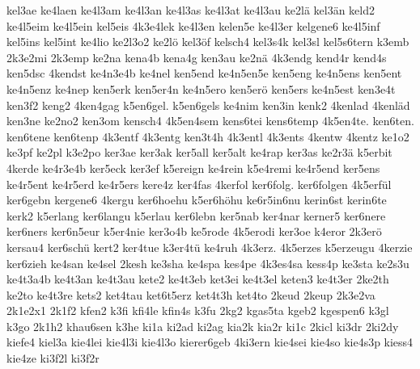 {    kel3ae
    ke4laen
    ke4l3am
    ke4l3an
    ke4l3as
    ke4l3at
    ke4l3au
    ke2lä
    kel3än
    keld2
    ke4l5eim
    ke4l5ein
    kel5eis
    4k3e4lek
    ke4l3en
    kelen5e
    ke4l3er
    kelgene6
    ke4l5inf
    kel5ins
    kel5int
    ke4lio
    ke2l3o2
    ke2lö
    kel3öf
    kelsch4
    kel3s4k
    kel3sl
    kel5s6tern
    k3emb
    2k3e2mi
    2k3emp
    ke2na
    kena4b
    kena4g
    ken3au
    ke2nä
    4k3endg
    kend4r
    kend4s
    ken5dsc
    4kendst
    ke4n3e4b
    ke4nel
    ken5end
    ke4n5en5e
    ken5eng
    ke4n5ens
    ken5ent
    ke4n5enz
    ke4nep
    ken5erk
    ken5er4n
    ke4n5ero
    ken5erö
    ken5ers
    ke4n5est
    ken3e4t
    ken3f2
    keng2
    4ken4gag
    k5en6gel.
    k5en6gels
    ke4nim
    ken3in
    kenk2
    4kenlad
    4kenläd
    ken3ne
    ke2no2
    ken3om
    kensch4
    4k5en4sem
    kens6tei
    kens6temp
    4k5en4te.
    ken6ten.
    ken6tene
    ken6tenp
    4k3entf
    4k3entg
    ken3t4h
    4k3entl
    4k3ents
    4kentw
    4kentz
    ke1o2
    ke3pf
    ke2pl
    k3e2po
    ker3ae
    ker3ak
    ker5all
    ker5alt
    ke4rap
    ker3as
    ke2r3ä
    k5erbit
    4kerde
    ke4r3e4b
    ker5eck
    ker3ef
    k5ereign
    ke4rein
    k5e4remi
    ke4r5end
    ker5ens
    ke4r5ent
    ke4r5erd
    ke4r5ers
    kere4z
    ker4fas
    4kerfol
    ker6folg.
    ker6folgen
    4k5erfül
    ker6gebn
    kergene6
    4kergu
    ker6hoehu
    k5er6höhu
    ke6r5in6nu
    kerin6st
    kerin6te
    kerk2
    k5erlang
    ker6langu
    k5erlau
    ker6lebn
    ker5nab
    ker4nar
    kerner5
    ker6nere
    ker6ners
    ker6n5eur
    k5er4nie
    ker3o4b
    ke5rode
    4k5erodi
    ker3oe
    k4eror
    2k3erö
    kersau4
    ker6schü
    kert2
    ker4tue
    k3er4tü
    ke4ruh
    4k3erz.
    4k5erzes
    k5erzeugu
    4kerzie
    ker6zieh
    ke4san
    ke4sel
    2kesh
    ke3sha
    ke4spa
    kes4pe
    4k3es4sa
    kess4p
    ke3sta
    ke2s3u
    ke4t3a4b
    ke4t3an
    ke4t3au
    kete2
    ke4t3eb
    ket3ei
    ke4t3el
    keten3
    ke4t3er
    2ke2th
    ke2to
    ke4t3re
    kets2
    ket4tau
    ket6t5erz
    ket4t3h
    ket4to
    2keud
    2keup
    2k3e2va
    2k1e2x1
    2k1f2
    kfen2
    k3fi
    kfi4le
    kfin4s
    k3fu
    2kg2
    kgas5ta
    kgeb2
    kgespen6
    k3gl
    k3go
    2k1h2
    khau6sen
    k3he
    ki1a
    ki2ad
    ki2ag
    kia2k
    kia2r
    ki1c
    2kicl
    ki3dr
    2ki2dy
    kiefe4
    kiel3a
    kie4lei
    kie4l3i
    kie4l3o
    kierer6geb
    4ki3ern
    kie4sei
    kie4so
    kie4s3p
    kiess4
    kie4ze
    ki3f2l
    ki3f2r
}
